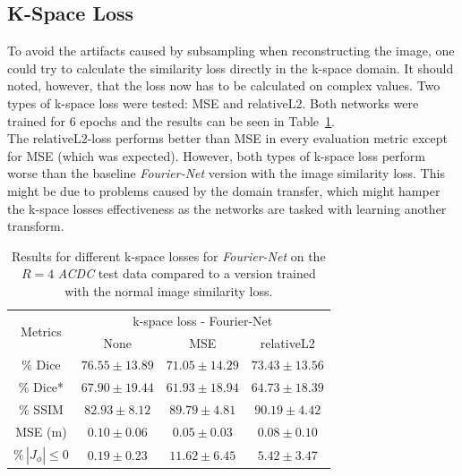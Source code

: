 \documentclass[english,version-2022-01]{uzl-thesis} %
\begin{document}
\subsection{K-Space Loss} \label{SubSec:ResultsK-SpaceLoss}
To avoid the artifacts caused by subsampling when reconstructing the image, one could try to calculate the similarity loss directly in the k-space domain. It should noted, however, that the loss now has to be calculated on complex values. Two types of k-space loss were tested: MSE and relativeL2. Both networks were trained for 6 epochs and the results can be seen in Table~\ref{tab:KSpaceLossFourierNetAcc4}.\\
The relativeL2-loss performs better than MSE in every evaluation metric except for MSE (which was expected). However, both types of k-space loss perform worse than the baseline \emph{Fourier-Net} version with the image similarity loss. This might be due to problems caused by the domain transfer, which might hamper the k-space losses effectiveness as the networks are tasked with learning another transform.

\begin{table}[h] %
	\centering
	\caption{Results for different k-space losses for \emph{Fourier-Net} on the $R=4$ \emph{ACDC} test data compared to a version trained with the normal image similarity loss.}
	\label{tab:KSpaceLossFourierNetAcc4}
	\begin{tabular}{c c c c} %
		\toprule
		\multirow{2}{*}{Metrics} & \multicolumn{3}{c}{k-space loss - Fourier-Net} \\
		\cline{2-4}
		 & None & MSE & relativeL2 \\		
		\midrule
		$\%$ Dice & $76.55 \pm 13.89$ & $71.05 \pm 14.29$ & $73.43 \pm 13.56$ \\
		$\%$ Dice* & $67.90 \pm 19.44$ & $61.93 \pm 18.94$ & $64.73 \pm 18.39$ \\
		$\%$ SSIM & $82.93 \pm 8.12$ & $89.79 \pm 4.81$ & $90.19 \pm 4.42$ \\
		MSE (m) & $0.10 \pm 0.06$ & $0.05 \pm 0.03$ & $0.08 \pm 0.10$ \\
		$\% \, |J_{\phi}|\leq0$ & $0.19 \pm 0.23$ & $11.62 \pm 6.45$ & $5.42 \pm 3.47$ \\
		\bottomrule
	\end{tabular}	
\end{table}
\end{document}
